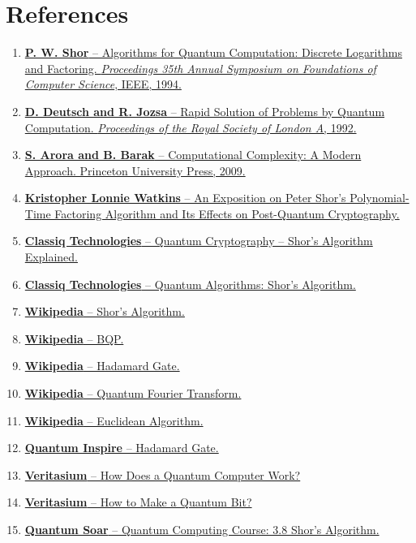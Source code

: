 

\section*{References}
\begin{enumerate}
  \item \href{https://ieeexplore.ieee.org/document/986127}{\textbf{P. W. Shor} – Algorithms for Quantum Computation: Discrete Logarithms and Factoring. \textit{Proceedings 35th Annual Symposium on Foundations of Computer Science}, IEEE, 1994.}
  \item \href{https://ieeexplore.ieee.org/document/365700}{\textbf{D. Deutsch and R. Jozsa} – Rapid Solution of Problems by Quantum Computation. \textit{Proceedings of the Royal Society of London A}, 1992.}
  \item \href{https://theory.cs.princeton.edu/complexity}{\textbf{S. Arora and B. Barak} – Computational Complexity: A Modern Approach. Princeton University Press, 2009.}
  \item \href{https://oaktrust.library.tamu.edu/bitstreams/0c4096c3-69d5-47af-ae7f-848309a9c0ca/download}{\textbf{Kristopher Lonnie Watkins} – An Exposition on Peter Shor’s Polynomial-Time Factoring Algorithm and Its Effects on Post-Quantum Cryptography.}
  \item \href{https://www.classiq.io/insights/shors-algorithm-explained}{\textbf{Classiq Technologies} – Quantum Cryptography – Shor’s Algorithm Explained.}
  \item \href{https://www.classiq.io/insights/quantum-algorithms-shors-algorithm}{\textbf{Classiq Technologies} – Quantum Algorithms: Shor’s Algorithm.}

  \item \href{https://en.wikipedia.org/wiki/Shor%27s_algorithm}{\textbf{Wikipedia} – Shor’s Algorithm.}
  \item \href{https://en.wikipedia.org/wiki/BQP}{\textbf{Wikipedia} – BQP.}
  \item \href{https://en.wikipedia.org/wiki/Hadamard_gate}{\textbf{Wikipedia} – Hadamard Gate.}
  \item \href{https://en.wikipedia.org/wiki/Quantum_Fourier_transform}{\textbf{Wikipedia} – Quantum Fourier Transform.}
  \item \href{https://en.wikipedia.org/wiki/Euclidean_algorithm}{\textbf{Wikipedia} – Euclidean Algorithm.}
  \item \href{https://www.quantum-inspire.com/hadamard-gate/}{\textbf{Quantum Inspire} – Hadamard Gate.}

  \item \href{https://www.youtube.com/watch?v=g_IaVepNDT4}{\textbf{Veritasium} – How Does a Quantum Computer Work?}
  \item \href{https://www.youtube.com/watch?v=zNzzGgr2mhk}{\textbf{Veritasium} – How to Make a Quantum Bit?}
  \item \href{https://www.youtube.com/watch?v=5_56TXtFVK4}{\textbf{Quantum Soar} – Quantum Computing Course: 3.8 Shor’s Algorithm.}

\end{enumerate}
